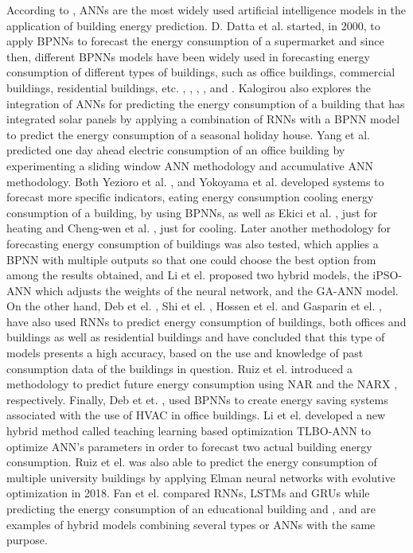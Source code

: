According to \cite{ann1}, \ac{ANN}s are the most widely used artificial intelligence models in the application of building energy prediction. D. Datta et al. \cite{annr1} started, in 2000, to apply \ac{BPNN}s to forecast the energy consumption of a supermarket and since then, different \ac{BPNN}s models have been widely used in forecasting energy consumption of different types of buildings, such as office buildings, commercial buildings, residential buildings, etc. \cite{annr4}, \cite{annr9}, \cite{annr13}, \cite{annr14}, \cite{annr17} and \cite{annr19}. Kalogirou \cite{annr2} also explores the integration of \ac{ANN}s for predicting the energy consumption of a building that has integrated solar panels by applying a combination of \ac{RNN}s with a \ac{BPNN} model to predict the energy consumption of a seasonal holiday house. Yang et al. \cite{annr3} predicted one day ahead electric consumption of an office building by experimenting a sliding window \ac{ANN} methodology and accumulative \ac{ANN} methodology. Both Yezioro et al. \cite{annr5}, and Yokoyama et al. \cite{annr7} developed systems to forecast more specific indicators, eating energy consumption cooling energy consumption of a building, by using \ac{BPNN}s, as well as Ekici et al. \cite{annr6}, just for heating and Cheng-wen et al. \cite{annr8}, just for cooling. Later another methodology for forecasting energy consumption of buildings was also tested, which applies a \ac{BPNN} with multiple outputs \cite{annr10} so that one could choose the best option from among the results obtained, and Li et el.\cite{annr12} proposed two hybrid models, the \ac{iPSO-ANN} which adjusts the weights of the neural network, and the \ac{GA-ANN} model.
On the other hand, Deb et el. \cite{annr15}, Shi et el. \cite{annr16}, Hossen et el. \cite{annr18} and Gasparin et el. \cite{annr21},  have also used \ac{RNN}s to predict energy consumption of buildings, both offices and buildings as well as residential buildings and have concluded that this type of models presents a high accuracy, based on the use and knowledge of past consumption data of the buildings in question. Ruiz et el. \cite{annr22} introduced a methodology to predict future energy consumption using \ac{NAR} and the \ac{NARX} , respectively.
Finally, Deb et et. \cite{annr20}, used \ac{BPNN}s to create energy saving systems associated with the use of \ac{HVAC} in office buildings.
Li et el. \cite{annr24} developed a new hybrid method called teaching learning based optimization \ac{TLBO-ANN} to optimize \ac{ANN}’s parameters in order to forecast two actual building energy consumption. Ruiz et el. \cite{annr25} was also able to predict the energy consumption of multiple university buildings by applying Elman neural networks with evolutive optimization in 2018. Fan et el. \cite{annr26} compared \ac{RNN}s, \ac{LSTM}s and \ac{GRU}s while predicting the energy consumption of an educational building and \cite{annr27}, \cite{annr28} and \cite{annr29} are examples of hybrid models combining several types or \ac{ANN}s with the same purpose. 


